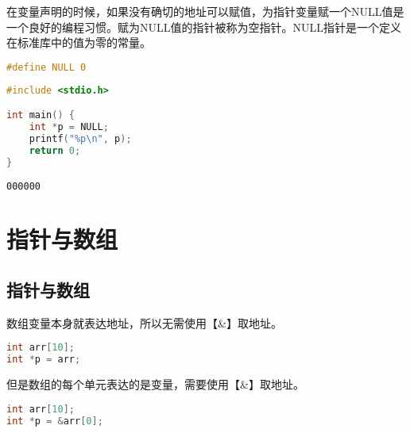 在变量声明的时候，如果没有确切的地址可以赋值，为指针变量赋一个NULL值是一个良好的编程习惯。赋为NULL值的指针被称为空指针。NULL指针是一个定义在标准库中的值为零的常量。

\vspace{-0.5cm}

\begin{lstlisting}[language=C]
#define NULL 0
\end{lstlisting}

\vspace{0.5cm}


\begin{lstlisting}[language=C]
#include <stdio.h>

int main() {
    int *p = NULL;
    printf("%p\n", p);
    return 0;
}
\end{lstlisting}

\begin{tcolorbox}
	\begin{verbatim}
000000
	\end{verbatim}
\end{tcolorbox}

\newpage

\section{指针与数组}

\subsection{指针与数组}

数组变量本身就表达地址，所以无需使用【\&】取地址。

\vspace{-0.5cm}

\begin{lstlisting}[language=C]
int arr[10];
int *p = arr;
\end{lstlisting}

但是数组的每个单元表达的是变量，需要使用【\&】取地址。

\vspace{-0.5cm}

\begin{lstlisting}[language=C]
int arr[10];
int *p = &arr[0];
\end{lstlisting}

\vspace{0.5cm}

